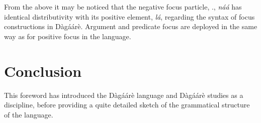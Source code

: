 \begin{refsection}
From the above it may be noticed that the negative focus particle, \textsc{{\FOC}.{\NEG}}, \textit{náá}
has identical distributivity with its positive element, \textit{lá}, regarding the syntax of focus
constructions in Dàgáárè. Argument and predicate focus are deployed in the same way as for
positive focus in the language.

\section{Conclusion}

This foreword has  introduced the Dàgáárè language and Dàgáárè studies as a discipline, before providing a quite detailed sketch of the grammatical structure of the language.




\printbibliography[heading=subbibliography]
\end{refsection}
